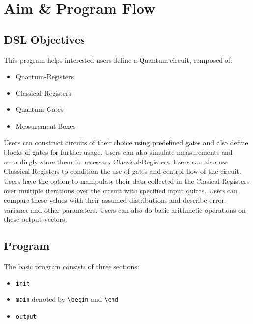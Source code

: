 \chapter{Aim \& Program Flow}\label{ch:Program}

\section{DSL Objectives}
This program helps interested users define a Quantum-circuit, composed of:
\begin{itemize}
    \item Quantum-Registers
    \item Classical-Registers
    \item Quantum-Gates
    \item Measurement Boxes
\end{itemize}

Users can construct circuits of their choice using predefined gates and also define blocks of gates for further usage. Users can also simulate 
measurements and accordingly store them in necessary Classical-Registers. Users can also use Classical-Registers to condition the use of gates and 
control flow of the circuit. \\

Users have the option to manipulate their data collected in the Clasical-Registers over multiple iterations over the circuit with specified input 
qubits. Users can compare these values with their assumed distributions and describe error, variance and other parameters. Users can also do basic 
arithmetic operations on these output-vectors. \\

\section{Program}

The basic program consists of three sections:
\begin{itemize}
    \item \texttt{init}
    \item \texttt{main} denoted by \texttt{\textbackslash begin} and \texttt{\textbackslash end}
    \item \texttt{output}
\end{itemize}


